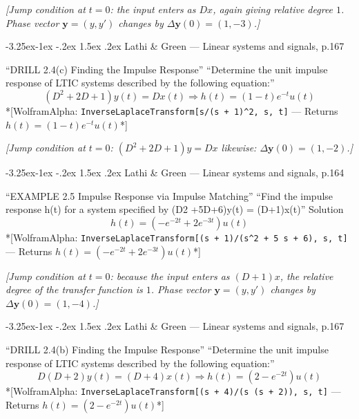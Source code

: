 \documentclass[
  11pt,
]{article}
\makeatletter
\providecommand{\implies}{\Longrightarrow}
\renewcommand\paragraph{\@startsection{paragraph}{4}{\z@}%
                                     {-3.25ex\@plus -1ex \@minus -.2ex}%
                                     {1.5ex \@plus .2ex}%
                                     {\normalfont\normalsize\bfseries}}
\makeatother
\begin{document}
\emph{{[}Jump condition at \(t=0\): the input enters as \(Dx\), again
giving relative degree \(1\). Phase vector \(\mathbf y=(y,y')\) changes
by \(\Delta\mathbf y(0)=(1,-3)\).{]}}

\hypertarget{lathi-green-linear-systems-and-signals-p.167-1}{%
\paragraph{Lathi \& Green --- Linear systems and signals,
p.167}\label{lathi-green-linear-systems-and-signals-p.167-1}}

``DRILL 2.4(c) Finding the Impulse Response'' ``Determine the unit
impulse response of LTIC systems described by the following equation:''
\[ (D^2 + 2D + 1)y(t) = Dx(t) \implies h(t)=(1 - t)e^{-t}u(t) \]
*{[}WolframAlpha:
\texttt{InverseLaplaceTransform{[}s/(s\ +\ 1)\^{}2,\ s,\ t{]}} ---
Returns \(h(t) = (1-t) e^{-t} u(t)\)*{]}

\emph{{[}Jump condition at \(t=0\): \((D^2+2D+1)y=Dx\) likewise:
\(\Delta\mathbf y(0)=(1,-2)\).{]}}

\hypertarget{lathi-green-linear-systems-and-signals-p.164}{%
\paragraph{Lathi \& Green --- Linear systems and signals,
p.164}\label{lathi-green-linear-systems-and-signals-p.164}}

``EXAMPLE 2.5 Impulse Response via Impulse Matching'' ``Find the impulse
response h(t) for a system specified by (D2 +5D+6)y(t) = (D+1)x(t)''
Solution \[ h(t) = (-e^{-2t} + 2e^{-3t})u(t) \] *{[}WolframAlpha:
\texttt{InverseLaplaceTransform{[}(s\ +\ 1)/(s\^{}2\ +\ 5\ s\ +\ 6),\ s,\ t{]}}
--- Returns \(h(t) = \left(-e^{-2t} + 2 e^{-3t}\right) u(t)\)*{]}

\emph{{[}Jump condition at \(t=0\): because the input enters as
\((D+1)x\), the relative degree of the transfer function is \(1\). Phase
vector \(\mathbf y=(y,y')\) changes by
\(\Delta\mathbf y(0)=(1,-4)\).{]}}

\hypertarget{lathi-green-linear-systems-and-signals-p.167-2}{%
\paragraph{Lathi \& Green --- Linear systems and signals,
p.167}\label{lathi-green-linear-systems-and-signals-p.167-2}}

``DRILL 2.4(b) Finding the Impulse Response'' ``Determine the unit
impulse response of LTIC systems described by the following equation:''
\[ D(D + 2)y(t) = (D + 4)x(t) \implies h(t)=(2 - e^{-2t})u(t) \]
*{[}WolframAlpha:
\texttt{InverseLaplaceTransform{[}(s\ +\ 4)/(s\ (s\ +\ 2)),\ s,\ t{]}}
--- Returns \(h(t) = \left(2 - e^{-2t}\right) u(t)\)*{]}
\end{document}
